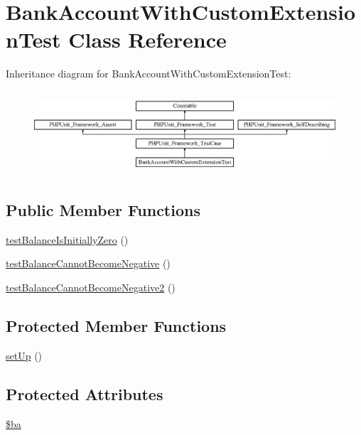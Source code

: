 \hypertarget{class_bank_account_with_custom_extension_test}{}\section{Bank\+Account\+With\+Custom\+Extension\+Test Class Reference}
\label{class_bank_account_with_custom_extension_test}
Inheritance diagram for Bank\+Account\+With\+Custom\+Extension\+Test\+:\begin{figure}[H]
\begin{center}
\leavevmode
\includegraphics[height=3.150492cm]{class_bank_account_with_custom_extension_test}
\end{center}
\end{figure}
\subsection*{Public Member Functions}
\begin{DoxyCompactItemize}
\item 
\mbox{\hyperlink{class_bank_account_with_custom_extension_test_a4310a4efd32e1e27b0316b486e6db401}{test\+Balance\+Is\+Initially\+Zero}} ()
\item 
\mbox{\hyperlink{class_bank_account_with_custom_extension_test_ab6da974ba63ca8ea1227cbcd33cde45a}{test\+Balance\+Cannot\+Become\+Negative}} ()
\item 
\mbox{\hyperlink{class_bank_account_with_custom_extension_test_ab2649a638e0cf85418cb1fb149d9e98c}{test\+Balance\+Cannot\+Become\+Negative2}} ()
\end{DoxyCompactItemize}
\subsection*{Protected Member Functions}
\begin{DoxyCompactItemize}
\item 
\mbox{\hyperlink{class_bank_account_with_custom_extension_test_a0bc688732d2b3b162ffebaf7812e78da}{set\+Up}} ()
\end{DoxyCompactItemize}
\subsection*{Protected Attributes}
\begin{DoxyCompactItemize}
\item 
\mbox{\hyperlink{class_bank_account_with_custom_extension_test_ae7b743e1b852cb919e9e56c76b9f4558}{\$ba}}
\end{DoxyCompactItemize}
